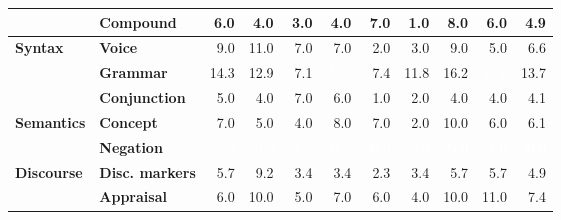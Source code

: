 \begin{table}[h]
{\begin{tabular}{llrrrrrrrrr}
  & \textbf{Compound} & \cellcolor{blue!15} 6.0 & \cellcolor{blue!10} 4.0 & \cellcolor{blue!8} 3.0 & \cellcolor{blue!10} 4.0 & \cellcolor{blue!18} 7.0 & \cellcolor{blue!3} 1.0 & \cellcolor{blue!21} 8.0 & \cellcolor{blue!15} 6.0 & \cellcolor{blue!13} 4.9 \\
\midrule
\textbf{Syntax} & \textbf{Voice} & \cellcolor{blue!23} 9.0 & \cellcolor{blue!28} 11.0 & \cellcolor{blue!18} 7.0 & \cellcolor{blue!18} 7.0 & \cellcolor{blue!5} 2.0 & \cellcolor{blue!8} 3.0 & \cellcolor{blue!23} 9.0 & \cellcolor{blue!13} 5.0 & \cellcolor{blue!17} 6.6 \\
  & \textbf{Grammar} & \cellcolor{blue!37} 14.3 & \cellcolor{blue!33} 12.9 & \cellcolor{blue!18} 7.1 & \cellcolor{blue!53} \textcolor{white}{20.6} & \cellcolor{blue!19} 7.4 & \cellcolor{blue!30} 11.8 & \cellcolor{blue!42} 16.2 & \cellcolor{blue!49} \textcolor{white}{19.1} & \cellcolor{blue!35} 13.7 \\
  & \textbf{Conjunction} & \cellcolor{blue!13} 5.0 & \cellcolor{blue!10} 4.0 & \cellcolor{blue!18} 7.0 & \cellcolor{blue!15} 6.0 & \cellcolor{blue!3} 1.0 & \cellcolor{blue!5} 2.0 & \cellcolor{blue!10} 4.0 & \cellcolor{blue!10} 4.0 & \cellcolor{blue!11} 4.1 \\
\midrule
\textbf{Semantics} & \textbf{Concept} & \cellcolor{blue!18} 7.0 & \cellcolor{blue!13} 5.0 & \cellcolor{blue!10} 4.0 & \cellcolor{blue!21} 8.0 & \cellcolor{blue!18} 7.0 & \cellcolor{blue!5} 2.0 & \cellcolor{blue!26} 10.0 & \cellcolor{blue!15} 6.0 & \cellcolor{blue!16} 6.1 \\
  & \textbf{Negation} & \cellcolor{blue!75} \textcolor{white}{29.0} & \cellcolor{blue!80} \textcolor{white}{39.0} & \cellcolor{blue!80} \textcolor{white}{31.0} & \cellcolor{blue!80} \textcolor{white}{31.0} & \cellcolor{blue!77} \textcolor{white}{30.0} & \cellcolor{blue!77} \textcolor{white}{30.0} & \cellcolor{blue!65} \textcolor{white}{25.0} & \cellcolor{blue!65} \textcolor{white}{25.0} & \cellcolor{blue!77} \textcolor{white}{30.0} \\
\midrule
\textbf{Discourse} & \textbf{Disc. markers} & \cellcolor{blue!15} 5.7 & \cellcolor{blue!24} 9.2 & \cellcolor{blue!9} 3.4 & \cellcolor{blue!9} 3.4 & \cellcolor{blue!6} 2.3 & \cellcolor{blue!9} 3.4 & \cellcolor{blue!15} 5.7 & \cellcolor{blue!15} 5.7 & \cellcolor{blue!13} 4.9 \\
  & \textbf{Appraisal} & \cellcolor{blue!15} 6.0 & \cellcolor{blue!26} 10.0 & \cellcolor{blue!13} 5.0 & \cellcolor{blue!18} 7.0 & \cellcolor{blue!15} 6.0 & \cellcolor{blue!10} 4.0 & \cellcolor{blue!26} 10.0 & \cellcolor{blue!28} 11.0 & \cellcolor{blue!19} 7.4 \\

\end{tabular}}
\end{table}
